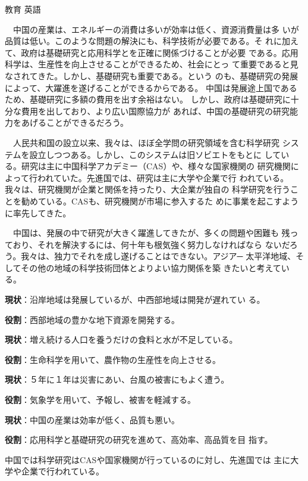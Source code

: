 \documentclass[fleqn]{jbook}
\begin{document}
\begin{answer}{教育 英語}{}
\begin{subanswers}
  　中国の産業は、エネルギーの消費は多いが効率は低く、資源消費量は多
いが品質は低い。このような問題の解決にも、科学技術が必要である。そ
れに加えて、政府は基礎研究と応用科学とを正確に関係づけることが必要
である。応用科学は、生産性を向上させることができるため、社会にとっ
て重要であると見なされてきた。しかし、基礎研究も重要である。という
のも、基礎研究の発展によって、大躍進を遂げることができるからである。
中国は発展途上国であるため、基礎研究に多額の費用を出す余裕はない。
しかし、政府は基礎研究に十分な費用を出しており、より広い国際協力が
あれば、中国の基礎研究の研究能力をあげることができるだろう。

  　人民共和国の設立以来、我々は、ほぼ全学問の研究領域を含む科学研究
システムを設立しつつある。しかし、このシステムは旧ソビエトをもとに
している。研究は主に中国科学アカデミー（CAS）や、様々な国家機関の
研究機関によって行われていた。先進国では、研究は主に大学や企業で行
われている。我々は、研究機関が企業と関係を持ったり、大企業が独自の
科学研究を行うことを勧めている。CASも、研究機関が市場に参入するた
めに事業を起こすように率先してきた。

  　中国は、発展の中で研究が大きく躍進してきたが、多くの問題や困難も
残っており、それを解決するには、何十年も根気強く努力しなければなら
ないだろう。我々は、独力でそれを成し遂げることはできない。アジア─
太平洋地域、そしてその他の地域の科学技術団体とよりよい協力関係を築
きたいと考えている。

  \begin{subsubanswers}
  \SubSubAnswer
        {\bf 現状}：沿岸地域は発展しているが、中西部地域は開発が遅れてい
る。

        {\bf 役割}：西部地域の豊かな地下資源を開発する。


        {\bf 現状}：増え続ける人口を養うだけの食料と水が不足している。

        {\bf 役割}：生命科学を用いて、農作物の生産性を向上させる。


        {\bf 現状}：５年に１年は災害にあい、台風の被害にもよく遭う。

        {\bf 役割}：気象学を用いて、予報し、被害を軽減する。


        {\bf 現状}：中国の産業は効率が低く、品質も悪い。

        {\bf 役割}：応用科学と基礎研究の研究を進めて、高効率、高品質を目
指す。

  \SubSubAnswer

  中国では科学研究はCASや国家機関が行っているのに対し、先進国では
  主に大学や企業で行われている。


\end{subsubanswers}
\end{subanswers}
\end{answer}
\end{document}

